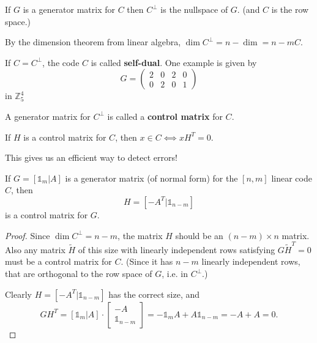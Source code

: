 \documentclass[english]{lbscript}
\begin{document}
\begin{remark}{}{}
	If \(G\) is a generator matrix for \(C\) then \(C^{⟂}\) is the nullspace of \(G\). (and \(C\) is the row space.)

	By the dimension theorem from linear algebra, \(\dim C^{⟂}=n-\dim =n-mC\).

	If \(C=C^{⟂}\), the code \(C\) is called \textbf{self-dual}. One example is given by
	\begin{equation}
		\label{eq:141}
		G=\begin{pmatrix}
			2 & 0 & 2 & 0 \\
			0 & 2 & 0 & 1
		\end{pmatrix}
	\end{equation} in \(ℤ_{5}^{4}\)
\end{remark}

\begin{definition}{}{}
	A generator matrix for \(C^{⟂}\) is called a \textbf{control matrix} for \(C\).
\end{definition}

\begin{remark}{}{}
	If \(H\) is a control matrix for \(C\), then \(x∈C⟺xH^{T}=0\).

	This gives us an efficient way to detect errors!
\end{remark}

\begin{theorem}{}{}
	If \(G=[𝟙_{m}|A]\) is a generator matrix (of normal form) for the \([n, m]\) linear code \(C\), then
	\begin{equation}
		\label{eq:142}
		H= \left[ -A^{T}| 𝟙_{n-m} \right]
	\end{equation}
	is a control matrix for \(G\).
\end{theorem}
\begin{proof}
	Since \(\dim C^{⟂}=n-m\), the matrix \(H\) should be an \((n-m)×n\) matrix. Also any matrix \(\tilde{H}\) of this size with linearly independent rows satisfying \(G\tilde{H}^{T}=0\) must be a control matrix for \(C\). (Since it has \(n-m\) linearly independent rows, that are orthogonal to the row space of \(G\), i.e. in \(C^{⟂}\).)

	Clearly \(H=[-A^{T}|𝟙_{n-m}]\) has the correct size, and
	\begin{equation}
		\label{eq:143}
		GH^{T}=[𝟙_{m}|A]⋅ \begin{bmatrix} -A \\ 𝟙_{n-m} \end{bmatrix} = -𝟙_{m}A+A𝟙_{n-m}=-A+A=0.
	\end{equation}
\end{proof}
\end{document}
